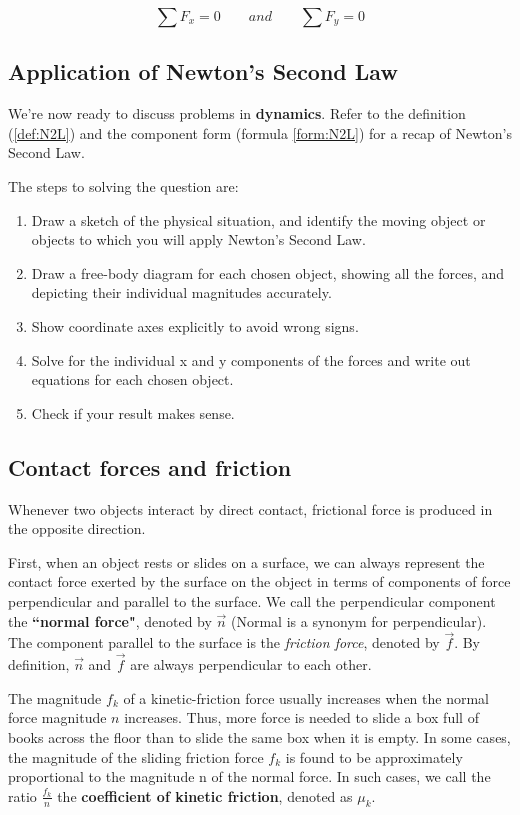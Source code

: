 \begin{form}
$$\sum F_x = 0 \qquad and \qquad \sum F_y=0$$
\end{form}

\subsection{Application of Newton's Second Law}
We're now ready to discuss problems in \textbf{dynamics}. Refer to the definition (\ref{def:N2L}) and the component form (formula \ref{form:N2L}) for a recap of Newton's Second Law.

The steps to solving the question are:
\begin{enumerate}
\item Draw a sketch of the physical situation, and identify the moving object or objects to which you will apply Newton's Second Law.
\item Draw a free-body diagram for each chosen object, showing all the forces, and depicting their individual magnitudes accurately.
\item Show coordinate axes explicitly to avoid wrong signs.
\item Solve for the individual x and y components of the forces and write out equations for each chosen object.
\item Check if your result makes sense.
\end{enumerate}

\subsection{Contact forces and friction}
Whenever two objects interact by direct contact, frictional force is produced in the opposite direction. 

First, when an object rests or slides on a surface, we can always represent the contact force exerted by the surface on the object in terms of components of force perpendicular and parallel to the surface. We call the perpendicular component the \textbf{``normal force"}, denoted by $\vec{n}$ (Normal is a synonym for perpendicular). The component parallel to the surface is the \emph{friction force}, denoted by $\vec{f}$. By definition, $\vec{n}$ and $\vec{f}$ are always perpendicular to each other.

The magnitude $f_k$ of a kinetic-friction force usually increases when the normal force magnitude $n$ increases. Thus, more force is needed to slide a box full of books across the floor than to slide the same box when it is empty. In some cases, the magnitude of the sliding friction force $f_k$ is found to be approximately proportional to the magnitude n of the normal force. In such cases, we call the ratio $\frac{f_k}{n}$ the \textbf{coefficient of kinetic friction}, denoted as $\mu_k$.

